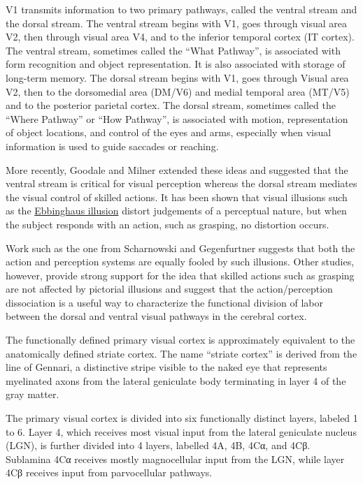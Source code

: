 V1 transmits information to two primary pathways, called the ventral stream and the dorsal stream. The ventral stream begins with V1, goes through visual area V2, then through visual area V4, and to the inferior temporal cortex (IT cortex). The ventral stream, sometimes called the ``What Pathway'', is associated with form recognition and object representation. It is also associated with storage of long-term memory.
The dorsal stream begins with V1, goes through Visual area V2, then to the dorsomedial area (DM/V6) and medial temporal area (MT/V5) and to the posterior parietal cortex. The dorsal stream, sometimes called the ``Where Pathway'' or ``How Pathway'', is associated with motion, representation of object locations, and control of the eyes and arms, especially when visual information is used to guide saccades or reaching.

More recently, Goodale and Milner extended these ideas and suggested that the ventral stream is critical for visual perception whereas the dorsal stream mediates the visual control of skilled actions. It has been shown that visual illusions such as the \href{https://en.wikipedia.org/wiki/Ebbinghaus_illusion}{Ebbinghaus illusion} distort judgements of a perceptual nature, but when the subject responds with an action, such as grasping, no distortion occurs.

Work such as the one from Scharnowski and Gegenfurtner suggests that both the action and perception systems are equally fooled by such illusions. Other studies, however, provide strong support for the idea that skilled actions such as grasping are not affected by pictorial illusions and suggest that the action/perception dissociation is a useful way to characterize the functional division of labor between the dorsal and ventral visual pathways in the cerebral cortex.

The functionally defined primary visual cortex is approximately equivalent to the anatomically defined striate cortex. The name ``striate cortex'' is derived from the line of Gennari, a distinctive stripe visible to the naked eye that represents myelinated axons from the lateral geniculate body terminating in layer 4 of the gray matter.

The primary visual cortex is divided into six functionally distinct layers, labeled 1 to 6. Layer 4, which receives most visual input from the lateral geniculate nucleus (LGN), is further divided into 4 layers, labelled 4A, 4B, 4Cα, and 4Cβ. Sublamina 4Cα receives mostly magnocellular input from the LGN, while layer 4Cβ receives input from parvocellular pathways.


